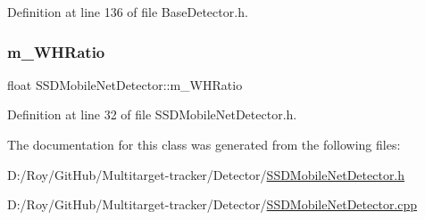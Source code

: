 Definition at line 136 of file Base\+Detector.\+h.

\mbox{\label{class_s_s_d_mobile_net_detector_ac4f9e209a12a97a3a8696f1df0d1f046}} 
\subsubsection{\texorpdfstring{m\+\_\+\+W\+H\+Ratio}{m\_WHRatio}}
{\footnotesize\ttfamily float S\+S\+D\+Mobile\+Net\+Detector\+::m\+\_\+\+W\+H\+Ratio\hspace{0.3cm}{\ttfamily [private]}}



Definition at line 32 of file S\+S\+D\+Mobile\+Net\+Detector.\+h.



The documentation for this class was generated from the following files\+:\begin{DoxyCompactItemize}
\item 
D\+:/\+Roy/\+Git\+Hub/\+Multitarget-\/tracker/\+Detector/\mbox{\hyperlink{_s_s_d_mobile_net_detector_8h}{S\+S\+D\+Mobile\+Net\+Detector.\+h}}\item 
D\+:/\+Roy/\+Git\+Hub/\+Multitarget-\/tracker/\+Detector/\mbox{\hyperlink{_s_s_d_mobile_net_detector_8cpp}{S\+S\+D\+Mobile\+Net\+Detector.\+cpp}}\end{DoxyCompactItemize}
